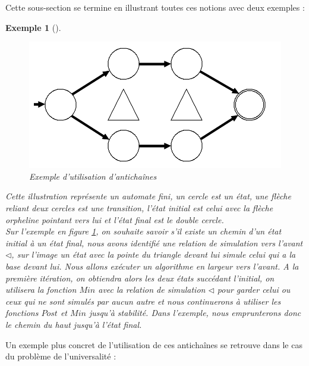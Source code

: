 \documentclass[a4paper]{report}
\theoremstyle{break}
\newtheorem{exem}{Exemple}
\begin{document}
Cette sous-section se termine en illustrant toutes ces notions avec deux exemples :

\begin{exem}[]
\begin{figure}[!h]
\includegraphics[width=\textwidth]{images/exanti2.png}
\caption{Exemple d'utilisation d'antichaînes}
\label{dfna}
\end{figure}

Cette illustration représente un automate fini, un cercle est un état, une flèche reliant deux cercles est une transition, l'état initial est celui avec la flèche orpheline pointant vers lui et l'état final est le double cercle.\\

Sur l'exemple en figure \ref{dfna}, on souhaite savoir s'il existe un chemin d'un état initial à un état final, nous avons identifié une relation de simulation vers l'avant $\triangleleft$, sur l'image un état avec la pointe du triangle devant lui simule celui qui a la base devant lui. Nous allons exécuter un algorithme en largeur vers l'avant. A la première itération, on obtiendra alors les deux états succédant l'initial, on utilisera la fonction $Min$ avec la relation de simulation $\triangleleft$ pour garder celui ou ceux qui ne sont simulés par aucun autre et nous continuerons à utiliser les fonctions $Post$ et $Min$ jusqu'à stabilité. Dans l'exemple, nous emprunterons donc le chemin du haut jusqu'à l'état final.

\end{exem}

Un exemple plus concret de l'utilisation de ces antichaînes se retrouve dans le cas du problème de l'universalité :
\end{document}
